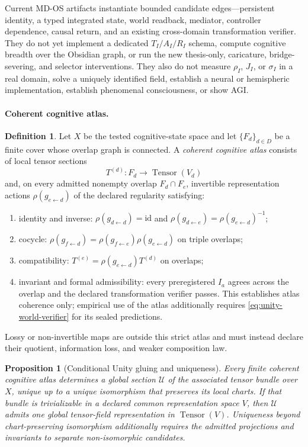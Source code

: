 \documentclass[10pt,twocolumn]{article}
\theoremstyle{definition}
\newtheorem{definition}{Definition}
\theoremstyle{plain}
\newtheorem{proposition}{Proposition}
\theoremstyle{remark}
\begin{document}
Current MD-OS artifacts instantiate bounded candidate edges---persistent identity, a typed integrated state, world readback, mediator, controller dependence, causal return, and an existing cross-domain transformation verifier.  They do not yet implement a dedicated $T_I/A_I/R_I$ schema, compute cognitive breadth over the Obsidian graph, or run the new thesis-only, caricature, bridge-severing, and selector interventions.  They also do not measure $\rho_I$, $J_I$, or $\sigma_I$ in a real domain, solve a uniquely identified field, establish a neural or hemispheric implementation, establish phenomenal consciousness, or show AGI.

\paragraph{Coherent cognitive atlas.}
\begin{definition}
Let $X$ be the tested cognitive-state space and let $\{F_d\}_{d\in D}$ be a finite cover whose overlap graph is connected.  A \emph{coherent cognitive atlas} consists of local tensor sections
\[
T^{(d)}:F_d\longrightarrow \operatorname{Tensor}(V_d)
\]
and, on every admitted nonempty overlap $F_d\cap F_e$, invertible representation actions $\rho(g_{e\leftarrow d})$ of the declared regularity satisfying:
\begin{enumerate}
  \item identity and inverse: $\rho(g_{d\leftarrow d})=\mathrm{id}$ and $\rho(g_{d\leftarrow e})=\rho(g_{e\leftarrow d})^{-1}$;
  \item cocycle: $\rho(g_{f\leftarrow d})=\rho(g_{f\leftarrow e})\rho(g_{e\leftarrow d})$ on triple overlaps;
  \item compatibility: $T^{(e)}=\rho(g_{e\leftarrow d})T^{(d)}$ on overlaps;
  \item invariant and formal admissibility: every preregistered $I_a$ agrees across the overlap and the declared transformation verifier passes.  This establishes atlas coherence only; empirical use of the atlas additionally requires \cref{eq:unity-world-verifier} for its sealed predictions.
\end{enumerate}
Lossy or non-invertible maps are outside this strict atlas and must instead declare their quotient, information loss, and weaker composition law.
\end{definition}

\begin{proposition}[Conditional Unity gluing and uniqueness]
\label{prop:unity-gluing}
Every finite coherent cognitive atlas determines a global section $\mathcal U$ of the associated tensor bundle over $X$, unique up to a unique isomorphism that preserves its local charts.  If that bundle is trivializable in a declared common representation space $V$, then $\mathcal U$ admits one global tensor-field representation in $\operatorname{Tensor}(V)$.  Uniqueness beyond chart-preserving isomorphism additionally requires the admitted projections and invariants to separate non-isomorphic candidates.
\end{proposition}
\end{document}
